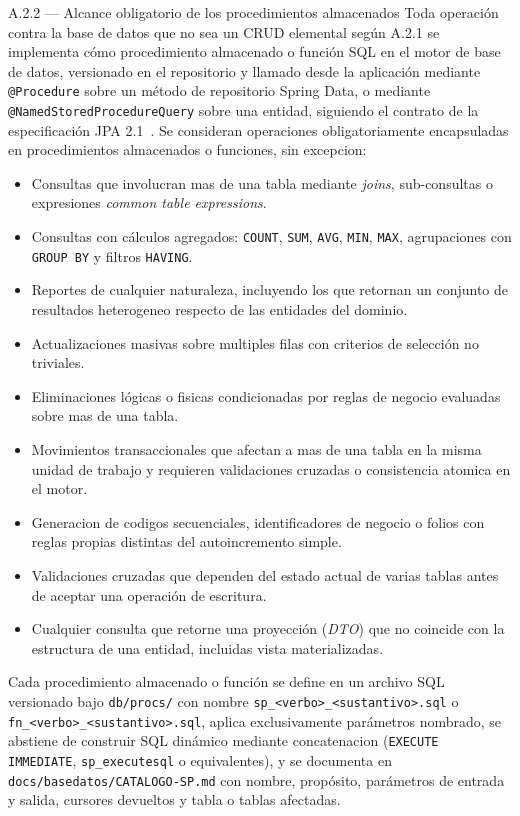 \documentclass[11pt,a4paper]{article}
\begin{document}
\begin{cajarepo}{A.2.2 --- Alcance obligatorio de los procedimientos almacenados}
    Toda operaci\'{o}n contra la base de datos que no sea un CRUD elemental seg\'{u}n A.2.1 se implementa c\'{o}mo procedimiento almacenado o funci\'{o}n SQL en el motor de base de datos, versionado en el repositorio y llamado desde la aplicaci\'{o}n mediante \texttt{@Procedure} sobre un m\'{e}todo de repositorio Spring Data, o mediante \texttt{@NamedStoredProcedureQuery} sobre una entidad, siguiendo el contrato de la especificaci\'{o}n JPA 2.1~\cite{demichiel2013jpa21,springdata2025procedures}. Se consideran operaciones obligatoriamente encapsuladas en procedimientos almacenados o funciones, sin excepcion:
    \begin{itemize}
        \item Consultas que involucran mas de una tabla mediante \emph{joins}, sub-consultas o expresiones \emph{common table expressions}.
        \item Consultas con c\'{a}lculos agregados: \texttt{COUNT}, \texttt{SUM}, \texttt{AVG}, \texttt{MIN}, \texttt{MAX}, agrupaciones con \texttt{GROUP BY} y filtros \texttt{HAVING}.
        \item Reportes de cualquier naturaleza, incluyendo los que retornan un conjunto de resultados heterogeneo respecto de las entidades del dominio.
        \item Actualizaciones masivas sobre multiples filas con criterios de selecci\'{o}n no triviales.
        \item Eliminaciones l\'{o}gicas o fisicas condicionadas por reglas de negocio evaluadas sobre mas de una tabla.
        \item Movimientos transaccionales que afectan a mas de una tabla en la misma unidad de trabajo y requieren validaciones cruzadas o consistencia atomica en el motor.
        \item Generacion de codigos secuenciales, identificadores de negocio o folios con reglas propias distintas del autoincremento simple.
        \item Validaciones cruzadas que dependen del estado actual de varias tablas antes de aceptar una operaci\'{o}n de escritura.
        \item Cualquier consulta que retorne una proyecci\'{o}n (\emph{DTO}) que no coincide con la estructura de una entidad, incluidas vista materializadas.
    \end{itemize}
    Cada procedimiento almacenado o funci\'{o}n se define en un archivo SQL versionado bajo \texttt{db/procs/} con nombre \texttt{sp\_<verbo>\_<sustantivo>.sql} o \texttt{fn\_<verbo>\_<sustantivo>.sql}, aplica exclusivamente par\'{a}metros nombrado, se abstiene de construir SQL din\'{a}mico mediante concatenacion (\texttt{EXECUTE IMMEDIATE}, \texttt{sp\_executesql} o equivalentes), y se documenta en \texttt{docs/basedatos/CATALOGO-SP.md} con nombre, prop\'{o}sito, par\'{a}metros de entrada y salida, cursores devueltos y tabla o tablas afectadas.
\end{cajarepo}
\end{document}
